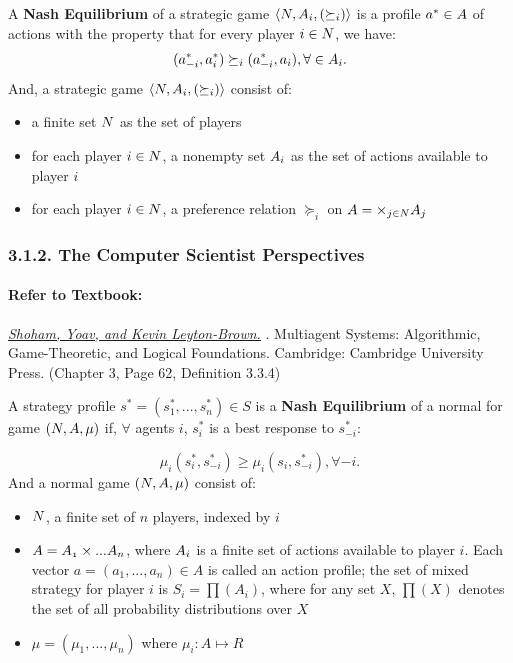 \documentclass[runningheads]{llncs}
\begin{document}
\begin{definition}
A \textbf{Nash Equilibrium} of a strategic game $\langle\mathnormal{N}, \mathnormal{A_{i}},(\succeq_{i})\rangle$ is a profile $a^{*}\in\mathnormal{A}$ of actions with the property that for every player $i\in \mathnormal{N}$, we have:
$$(a^{*}_{-i},a^{*}_{i}) \succeq_{i}(a^{*}_{-i},a_{i}), \forall \in \mathnormal{A_{i}}.$$
And, a strategic game $\langle\mathnormal{N}, \mathnormal{A_{i}},(\succeq_{i})\rangle$  consist of:
\begin{itemize}
    \item a finite set $\mathnormal{N}$ as the set of players
    \item for each player $i\in\mathnormal{N}$, a nonempty set $\mathnormal{A_{i}}$ as the set of actions available to player $i$
    \item for each player $i\in\mathnormal{N}$, a preference relation $\succeq_{i}$ on $\mathnormal{A}=\times_{j\in \mathnormal{N}}\mathnormal{A}_{j}$
\end{itemize}
\end{definition}

\subsubsection{3.1.2. The Computer Scientist Perspectives}

\paragraph{Refer to Textbook:} 
\href{http://www.masfoundations.org/mas.pdf}{\textit{\underline{Shoham, Yoav, and Kevin Leyton-Brown.}}} \citeyear{shoham2008multiagent}. Multiagent Systems: Algorithmic, Game-Theoretic, and Logical Foundations. Cambridge: Cambridge University Press. (Chapter 3, Page 62, Definition 3.3.4)
\begin{definition} A strategy profile $s^{*}=(s_{1}^{*},...,s_{n}^{*})\in S$ is a \textbf{Nash Equilibrium} of a normal for game $(\mathnormal{N}, \mathnormal{A}, \mu)$ if, $\forall$ agents $i$, $s_{i}^{*}$ is a best response to $s_{-i}^{*}$:

$$\mu_{i}(s_{i}^{*},s_{-i}^{*}) \geq \mu_{i}(s_{i},s_{-i}^{*}), \forall -i.$$
And a normal game $(\mathnormal{N}, \mathnormal{A}, \mu)$ consist of:
\begin{itemize}
    \item $\mathnormal{N}$, a finite set of $n$ players, indexed by $i$
    \item $\mathnormal{A} =\mathnormal{A_{1}}\times ...\mathnormal{A_{n}}$, where $\mathnormal{A_{i}}$ is a finite set of actions available to player $i$. Each vector $a=(a_{1},...,a_{n})\in A$ is called an action profile; the set of mixed strategy for player $i$ is $S_{i}=\prod(A_{i})$, where for any set $X$, $\prod(X)$ denotes the set of all probability distributions over $X$
    \item $\mu = (\mu_{1},...,\mu_{n})$ where $\mu_{i}: {A} \mapsto {R} $
\end{itemize}

\end{definition}
\end{document}
